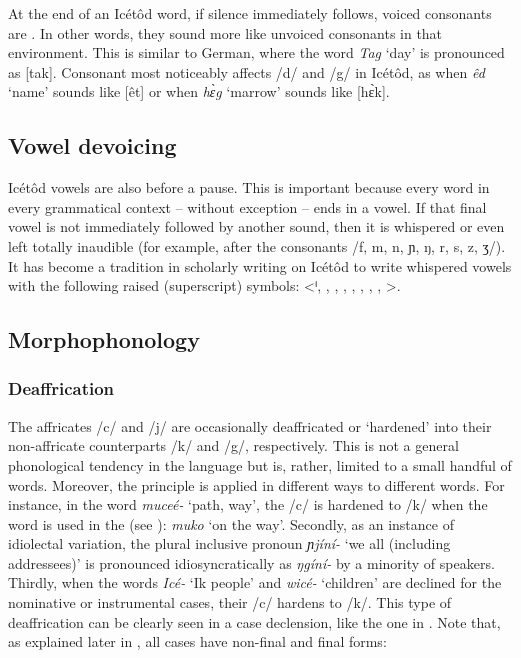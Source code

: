 At the end of an Icétôd word, if silence immediately follows, voiced consonants are . In other words, they sound more like unvoiced consonants in that environment. This is similar to German, where the word \textit{Tag} ‘day’ is pronounced as [tak]. Consonant  most noticeably affects /d/ and /g/ in Icétôd, as when \textit{êd} ‘name’ sounds like [êt] or when \textit{h\`{ɛ}g} ‘marrow’ sounds like [h\`{ɛ}k]. 
 
\subsection{Vowel devoicing}\label{sec:2.3}


Icétôd vowels are also  before a pause. This is important because every word in every grammatical context – without exception – ends in a vowel. If that final vowel is not immediately followed by another sound, then it is whispered or even left totally inaudible (for example, after the consonants /f, m, n, ɲ, ŋ, r, s, z, ʒ/). It has become a tradition in scholarly writing on Icétôd to write whispered vowels with the following raised (superscript) symbols: <ⁱ, \ᶤ, \ᵉ, \ᵋ, \ᵃ, \ᵓ, \ᵒ, \ᶶ, \ᵘ >.
 
\subsection{Morphophonology}\label{sec:2.4}
\subsubsection{Deaffrication}\label{sec:2.4.1}

The affricates /c/ and /j/ are occasionally deaffricated or ‘hardened’ into their non-affricate counterparts /k/ and /g/, respectively. This is not a general phonological tendency in the language but is, rather, limited to a small handful of words. Moreover, the principle is applied in different ways to different words. For instance, in the word \textit{muceé-} ‘path, way’, the /c/ is hardened to /k/ when the word is used in the  (see ): \textit{muko} ‘on the way’. Secondly, as an instance of idiolectal variation, the plural inclusive pronoun \textit{ɲjíní-} ‘we all (including addressees)’ is pronounced idiosyncratically as \textit{ŋgíní-} by a minority of speakers. Thirdly, when the words \textit{Icé-} ‘Ik people’ and \textit{wicé-} ‘children’ are declined for the nominative or instrumental cases, their /c/ hardens to /k/. This type of deaffrication can be clearly seen in a case declension, like the one in . Note that, as explained later in , all cases have non-final and final forms:


